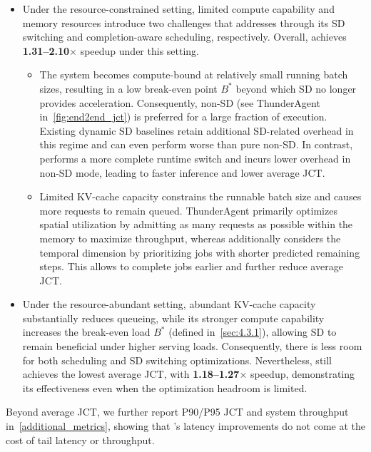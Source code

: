 \begin{itemize}[leftmargin=10pt]
    \item 
        Under the resource-constrained setting, limited compute capability and memory resources introduce two challenges that \sysname addresses through its SD switching and completion-aware scheduling, respectively.
        Overall, \sysname achieves \textbf{1.31--2.10$\times$} speedup under this setting.
        \begin{itemize}[leftmargin=10pt]
            \item 
                The system becomes compute-bound at relatively small running batch sizes, resulting in a low break-even point $B^{*}$ beyond which SD no longer provides acceleration.
                Consequently, non-SD (see ThunderAgent in~\autoref{fig:end2end_jct}) is preferred for a large fraction of execution.
                Existing dynamic SD baselines retain additional SD-related overhead in this regime and can even perform worse than pure non-SD. In contrast, \sysname performs a more complete runtime switch and incurs lower overhead in non-SD mode, leading to faster inference and lower average JCT.
            \item 
                Limited KV-cache capacity constrains the runnable batch size and causes more requests to remain queued.
                ThunderAgent primarily optimizes spatial utilization by admitting as many requests as possible within the memory to maximize throughput, whereas \sysname additionally considers the temporal dimension by prioritizing jobs with shorter predicted remaining steps.
                This allows \sysname to complete jobs earlier and further reduce average JCT.
        \end{itemize}
    \item 
        Under the resource-abundant setting, abundant KV-cache capacity substantially reduces queueing, while its stronger compute capability increases the break-even load $B^{*}$ (defined in~\autoref{sec:4.3.1}), allowing SD to remain beneficial under higher serving loads.
        Consequently, there is less room for both scheduling and SD switching optimizations.
        Nevertheless, \sysname still achieves the lowest average JCT, with \textbf{1.18--1.27$\times$} speedup, demonstrating its effectiveness even when the optimization headroom is limited.    
\end{itemize}


Beyond average JCT, we further report P90/P95 JCT and system throughput in~\autoref{additional_metrics}, showing that \sysname's latency improvements do not come at the cost of tail latency or throughput.

